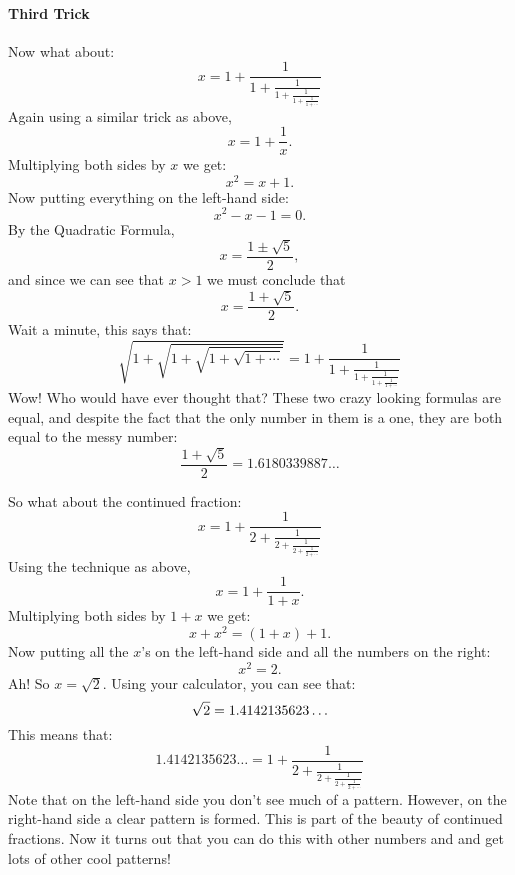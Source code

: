 \paragraph{Third Trick}
Now what about:
\[
x =   1 + \frac{1}{\displaystyle 1 
          + \frac{1}{\displaystyle 1 
          + \frac{1}{\displaystyle 1 
       + \frac{1}{\displaystyle 1 + \cdots
}}}}
\]
Again using a similar trick as above,
\[
x = 1+ \frac{1}{x}.
\]
Multiplying both sides by $x$ we get:
\[
x^2 = x + 1.
\]
Now putting everything on the left-hand side:
\[
x^2-x-1 = 0.
\]
By the Quadratic Formula, 
\[
x = \frac{1\pm \sqrt{5}}{2},
\]
and since we can see that $x> 1$ we must conclude that 
\[
x = \frac{1+ \sqrt{5}}{2}.
\]
Wait a minute, this says that:
\[
\sqrt{1+\sqrt{1+\sqrt{1+\sqrt{1+\cdots}}}} = 
1 + \frac{1}{\displaystyle 1 
          + \frac{1}{\displaystyle 1 
          + \frac{1}{\displaystyle 1 
       + \frac{1}{\displaystyle 1 + \cdots
}}}}
\]
Wow! Who would have ever thought that?  These two crazy looking
formulas are equal, and despite the fact that the only number in them
is a one, they are both equal to the messy number:
\[
\frac{1+\sqrt{5}}{2} = 1.6180339887\dots
\]

So what about the continued fraction:
\[
x = 1 + \frac{1}{\displaystyle 2
          + \frac{1}{\displaystyle 2 
          + \frac{1}{\displaystyle 2 
       + \frac{1}{\displaystyle 2 + \cdots
}}}}
\]
Using the technique as above,
\[
x = 1+ \frac{1}{1+x}.
\]
Multiplying both sides by $1+x$ we get:
\[
x+x^2 = (1+x) +1.
\]
Now putting all the $x$'s on the left-hand side and all the numbers on the right:
\[
x^2 = 2.
\]
Ah! So  $x = \sqrt{2}$. Using your calculator, you can see that:
\[
\sqrt{2} = 1.4142135623\dots \index{sqrt2@$\sqrt{2}$}
\]
This means that:
\[
1.4142135623\ldots = 1 + \frac{1}{\displaystyle 2
          + \frac{1}{\displaystyle 2 
          + \frac{1}{\displaystyle 2 
       + \frac{1}{\displaystyle 2 + \cdots
}}}}
\]
Note that on the left-hand side you don't see much of a
pattern. However, on the right-hand side a clear pattern is
formed. This is part of the beauty of continued fractions. Now it
turns out that you can do this with other numbers and and get lots of
other cool patterns!


